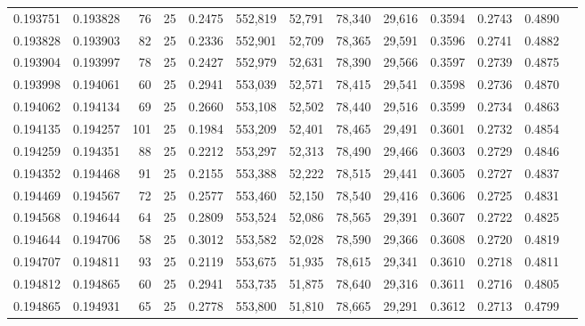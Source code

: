 \begin{tabular}{rrrrrrrrrrrrr}
0.193751 & 0.193828 &    76 &  25 &                                     0.2475 & 552,819 &  52,791 &  78,340 &  29,616 & 0.3594 & 0.2743 & 0.4890 \\
0.193828 & 0.193903 &    82 &  25 &                                     0.2336 & 552,901 &  52,709 &  78,365 &  29,591 & 0.3596 & 0.2741 & 0.4882 \\
0.193904 & 0.193997 &    78 &  25 &                                     0.2427 & 552,979 &  52,631 &  78,390 &  29,566 & 0.3597 & 0.2739 & 0.4875 \\
0.193998 & 0.194061 &    60 &  25 &                                     0.2941 & 553,039 &  52,571 &  78,415 &  29,541 & 0.3598 & 0.2736 & 0.4870 \\
0.194062 & 0.194134 &    69 &  25 &                                     0.2660 & 553,108 &  52,502 &  78,440 &  29,516 & 0.3599 & 0.2734 & 0.4863 \\
0.194135 & 0.194257 &   101 &  25 &                                     0.1984 & 553,209 &  52,401 &  78,465 &  29,491 & 0.3601 & 0.2732 & 0.4854 \\
0.194259 & 0.194351 &    88 &  25 &                                     0.2212 & 553,297 &  52,313 &  78,490 &  29,466 & 0.3603 & 0.2729 & 0.4846 \\
0.194352 & 0.194468 &    91 &  25 &                                     0.2155 & 553,388 &  52,222 &  78,515 &  29,441 & 0.3605 & 0.2727 & 0.4837 \\
0.194469 & 0.194567 &    72 &  25 &                                     0.2577 & 553,460 &  52,150 &  78,540 &  29,416 & 0.3606 & 0.2725 & 0.4831 \\
0.194568 & 0.194644 &    64 &  25 &                                     0.2809 & 553,524 &  52,086 &  78,565 &  29,391 & 0.3607 & 0.2722 & 0.4825 \\
0.194644 & 0.194706 &    58 &  25 &                                     0.3012 & 553,582 &  52,028 &  78,590 &  29,366 & 0.3608 & 0.2720 & 0.4819 \\
0.194707 & 0.194811 &    93 &  25 &                                     0.2119 & 553,675 &  51,935 &  78,615 &  29,341 & 0.3610 & 0.2718 & 0.4811 \\
0.194812 & 0.194865 &    60 &  25 &                                     0.2941 & 553,735 &  51,875 &  78,640 &  29,316 & 0.3611 & 0.2716 & 0.4805 \\
0.194865 & 0.194931 &    65 &  25 &                                     0.2778 & 553,800 &  51,810 &  78,665 &  29,291 & 0.3612 & 0.2713 & 0.4799 \\

\end{tabular}
